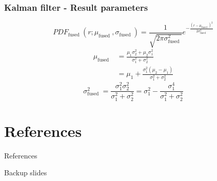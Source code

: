 \documentclass[10pt]{beamer}
\begin{document}
\begin{frame}
  \frametitle{Kalman filter - Result parameters}
  \begin{equation}
    PDF_{\text {fused }}\left(r ; \mu_{\text {fused }}, \sigma_{\text {fused }}\right) =\frac{1}{\sqrt{2 \pi \sigma_{\text {fused }}^{2}}} e^{-\frac{\left(r-\mu_{\text {fused }}\right)^{2}}{2 \sigma_{\text {fused }}^{2}}}
  \end{equation}
  \begin{equation}
    \begin{aligned}
    \mu_{\text {fused }} &=\frac{\mu_{1} \sigma_{2}^{2}+\mu_{2} \sigma_{1}^{2}}{\sigma_{1}^{2}+\sigma_{2}^{2}} \\
    &=\mu_{1}+\frac{\sigma_{1}^{2}\left(\mu_{2}-\mu_{1}\right)}{\sigma_{1}^{2}+\sigma_{2}^{2}}
    \end{aligned}
    \end{equation}
  \begin{equation}
      \sigma_{\text {fused }}^{2}=\frac{\sigma_{1}^{2} \sigma_{2}^{2}}{\sigma_{1}^{2}+\sigma_{2}^{2}}=\sigma_{1}^{2}-\frac{\sigma_{1}^{4}}{\sigma_{1}^{2}+\sigma_{2}^{2}}
  \end{equation}
\end{frame}

\section{References}
\begin{frame}[allowframebreaks]{References}
  
  
\end{frame}  


\begin{frame}[standout]
	Backup slides
\end{frame}
\end{document}
